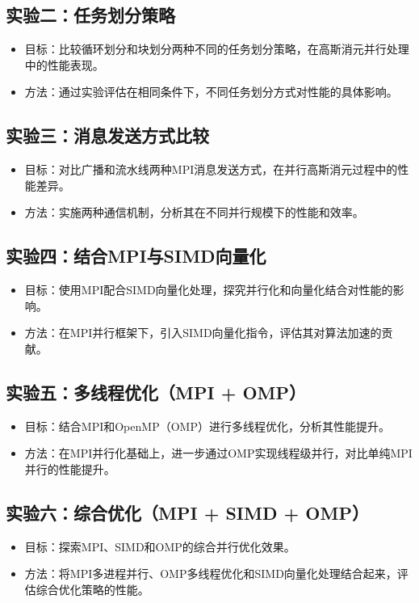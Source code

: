 \documentclass[UTF8,a4paper,10pt]{ctexart}
\begin{document}
\subsection{实验二：任务划分策略}
\begin{itemize}
  \item 目标：比较循环划分和块划分两种不同的任务划分策略，在高斯消元并行处理中的性能表现。
  \item 方法：通过实验评估在相同条件下，不同任务划分方式对性能的具体影响。
\end{itemize}
\subsection{实验三：消息发送方式比较}
\begin{itemize}
  \item 目标：对比广播和流水线两种MPI消息发送方式，在并行高斯消元过程中的性能差异。
  \item 方法：实施两种通信机制，分析其在不同并行规模下的性能和效率。
\end{itemize}
\subsection{实验四：结合MPI与SIMD向量化}
\begin{itemize}
  \item 目标：使用MPI配合SIMD向量化处理，探究并行化和向量化结合对性能的影响。
  \item 方法：在MPI并行框架下，引入SIMD向量化指令，评估其对算法加速的贡献。
\end{itemize}
\subsection{实验五：多线程优化（MPI + OMP）}
\begin{itemize}
  \item 目标：结合MPI和OpenMP（OMP）进行多线程优化，分析其性能提升。
  \item 方法：在MPI并行化基础上，进一步通过OMP实现线程级并行，对比单纯MPI并行的性能提升。
\end{itemize}
\subsection{实验六：综合优化（MPI + SIMD + OMP）}
\begin{itemize}
  \item 目标：探索MPI、SIMD和OMP的综合并行优化效果。
  \item 方法：将MPI多进程并行、OMP多线程优化和SIMD向量化处理结合起来，评估综合优化策略的性能。
\end{itemize}
\end{document}
